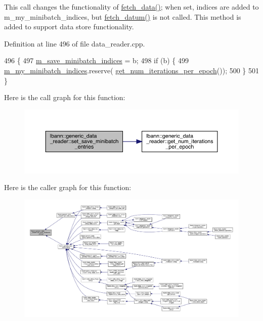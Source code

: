 This call changes the functionality of \hyperlink{classlbann_1_1generic__data__reader_a46b658ba4f6b746632b683568ab76f77}{fetch\+\_\+data()}; when set, indices are added to m\+\_\+my\+\_\+minibatch\+\_\+indices, but \hyperlink{classlbann_1_1generic__data__reader_a0a3cd87ed4a7057df185e0087f2d21c1}{fetch\+\_\+datum()} is not called. This method is added to support data store functionality. 

Definition at line 496 of file data\+\_\+reader.\+cpp.


\begin{DoxyCode}
496                                                            \{
497   \hyperlink{classlbann_1_1generic__data__reader_ab1d7cac44072bd1f67291c6169414112}{m\_save\_minibatch\_indices} = b;
498   \textcolor{keywordflow}{if} (b) \{
499     \hyperlink{classlbann_1_1generic__data__reader_a5048d99a58ccddf4fb170c6face8cf4e}{m\_my\_minibatch\_indices}.reserve(
      \hyperlink{classlbann_1_1generic__data__reader_a06fb58d1c0b84b8c76f5b4d160751f34}{get\_num\_iterations\_per\_epoch}());
500   \}
501 \}
\end{DoxyCode}
Here is the call graph for this function\+:\nopagebreak
\begin{figure}[H]
\begin{center}
\leavevmode
\includegraphics[width=350pt]{classlbann_1_1generic__data__reader_a19fd7c4dc234fa09ac7619e47fe18454_cgraph}
\end{center}
\end{figure}
Here is the caller graph for this function\+:\nopagebreak
\begin{figure}[H]
\begin{center}
\leavevmode
\includegraphics[width=350pt]{classlbann_1_1generic__data__reader_a19fd7c4dc234fa09ac7619e47fe18454_icgraph}
\end{center}
\end{figure}
\mbox{\label{classlbann_1_1generic__data__reader_a7b0fc770678e22c44a824e88444da765}} 
